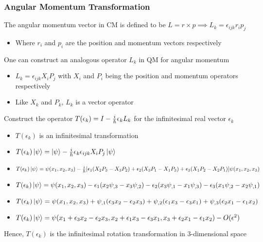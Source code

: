 \documentclass[8pt,t,mathserif,aspectratio=169]{beamer}
\begin{document}
\begin{frame}
  \frametitle{Angular Momentum Transformation}
  \vspace{1mm}
  The angular momentum vector in CM is defined to be $L=r \times p \implies L_k=\epsilon_{ijk} r_i p_j$
  \begin{itemize}
  	\item Where $r_i$ and $p_i$ are the position and momentum vectors respectively
  \end{itemize}
  One can construct an analogous operator $L_k$ in QM for angular momentum
  \begin{itemize}
  	\item $L_k = \epsilon_{ijk} X_i P_j$ with $X_i$ and $P_i$ being the position and momentum operators respectively 
  	\item Like $X_k$ and $P_k$, $L_k$ is a vector operator 
  \end{itemize}
  Construct the operator $T(\epsilon_k) = I - {i \over \hbar} \epsilon_k L_k$ for the infinitesimal real vector $\epsilon_k$
  \begin{itemize} 
  	\item $T(\epsilon_k)$ is an infinitesimal transformation
  	\item $T(\epsilon_k) \ket{\psi} = \ket{\psi} - {i \over \hbar} \epsilon_k \epsilon_{ijk} X_i P_j \ket{\psi}$
  	\item $T(\epsilon_k) \ket{\psi} = \psi(x_1,x_2,x_3) - {i \over \hbar} [\epsilon_1 (X_2 P_3 - X_3 P_2) + \epsilon_2 (X_3 P_1 - X_1 P_3) + \epsilon_3 (X_1 P_2 - X_2 P_1)] \psi(x_1,x_2,x_3)$
  	\item $T(\epsilon_k) \ket{\psi} = \psi(x_1,x_2,x_3) - \epsilon_1 (x_2 \psi_{,3} - x_3 \psi_{,2}) - \epsilon_2 (x_3 \psi_{,1} - x_1 \psi_{,3}) - \epsilon_3 (x_1 \psi_{,2} - x_2 \psi_{,1})$
  	\item $T(\epsilon_k) \ket{\psi} = \psi(x_1,x_2,x_3) + \psi_{,1} (\epsilon_3 x_2 - \epsilon_2 x_3) + \psi_{,2} (\epsilon_1 x_3 - \epsilon_3 x_1) + \psi_{,3} (\epsilon_2 x_1 - \epsilon_1 x_2)$
  	\item $T(\epsilon_k) \ket{\psi} = \psi(x_1 + \epsilon_3 x_2 - \epsilon_2 x_3,x_2 + \epsilon_1 x_3 - \epsilon_3 x_1,x_3 + \epsilon_2 x_1 - \epsilon_1 x_2) - O(\epsilon^2)$
  \end{itemize}
  Hence, $T(\epsilon_k)$ is the infinitesimal rotation transformation in 3-dimensional space
\end{frame}
\end{document}
